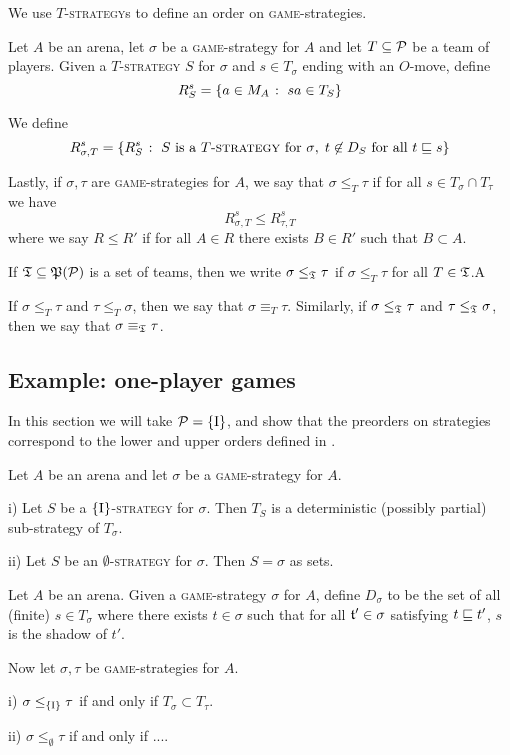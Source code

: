 \documentclass{article}
\newcommand{\game}{\textsc{game}}
\newcommand{\strategy}{\textsc{strategy}}
\begin{document}
We use $T$-\strategy{}s to define an order on \game{}-strategies.  

\begin{definition}
  Let $A$ be an arena, let $\sigma$ be a \game{}-strategy for $A$ and let $T\subset\P$ be a team of players.  
  Given a $T$-\strategy{} $S$ for $\sigma$ and $s\in T_\sigma$ ending with an $O$-move, define
  \[
    R_S^s = \{a\in M_A\suchthat sa\in T_S\}
    \]

  We define
  \[
    R_{\sigma,T}^s = \{R_S^s\suchthat \textrm{$S$ is a $T$-\strategy{} for $\sigma$},\;\textrm{$t\not\in D_S$ for all $t\prefix s$}\}
    \]

  Lastly, if $\sigma,\tau$ are \game{}-strategies for $A$, we say that $\sigma\le_T\tau$ if for all $s\in T_\sigma\cap T_\tau$ we have
  \[
    R_{\sigma,T}^s\le R_{\tau,T}^s
    \]
  where we say $R\le R'$ if for all $A\in R$ there exists $B\in R'$ such that $B\subset A$.  

  If $\T\subset\power(\P)$ is a set of teams, then we write $\sigma\le_{\T}\tau$ if $\sigma\le_T\tau$ for all $T\in\T$.A

  If $\sigma\le_T\tau$ and $\tau\le_T\sigma$, then we say that $\sigma\equiv_T\tau$.  
  Similarly, if $\sigma\le_{\T}\tau$ and $\tau\le_{\T}\sigma$, then we say that $\sigma\equiv_{\T}\tau$.  
\end{definition}

\subsection{Example: one-player games}

In this section we will take $\P=\{\RN{1}\}$, and show that the preorders on strategies correspond to the lower and upper orders defined in \cite{mcCHFiniteND}.

\begin{lemma}
  \label{lemma:guy}
  Let $A$ be an arena and let $\sigma$ be a \game{}-strategy for $A$.  

  i) Let $S$ be a $\{\RN{1}\}$-\strategy{} for $\sigma$.  
  Then $T_S$ is a deterministic (possibly partial) sub-strategy of $T_\sigma$.  

  ii) Let $S$ be an $\emptyset$-\strategy{} for $\sigma$.  
  Then $S=\sigma$ as sets.
\end{lemma}

\begin{proposition}
  Let $A$ be an arena.  
  Given a \game{}-strategy $\sigma$ for $A$, define $D_\sigma$ to be the set of all (finite) $s\in T_\sigma$ where there exists $t\in\sigma$ such that for all $\t'\in\sigma$ satisfying $t\prefix t'$, $s$ is the shadow of $t'$.  

  Now let $\sigma,\tau$ be \game{}-strategies for $A$.  

  i) $\sigma \le_{\{\RN{1}\}} \tau$ if and only if $T_\sigma\subset T_\tau$.  

  ii) $\sigma \le_{\emptyset} \tau$ if and only if ....
\end{proposition}
\end{document}
